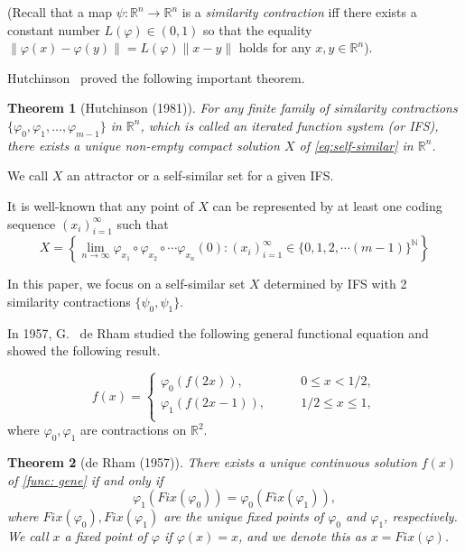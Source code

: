 \documentclass[epsf,10pt]{article}
\newtheorem{theorem}{Theorem}[section]
\begin{document}
(Recall that a map $\psi:\mathbb{R}^{n} \rightarrow \mathbb{R}^{n}$ is a {\it similarity contraction} iff there exists a constant number $L(\varphi) \in (0,1)$ so that the equality $\|\varphi(x)-\varphi(y)\|=L(\varphi)\|x-y\|$ holds for any $x,y \in \mathbb{R}^{n}$).

Hutchinson~\cite{Hutchinson-1981} proved the following important theorem. 
\begin{theorem}[Hutchinson (1981)]
\label{th:hutchinson}
For any finite family of similarity contractions $\{\varphi_0, \varphi_1, ..., \varphi_{m-1}\}$ in $\mathbb{R}^{n}$, which is called an iterated function system (or IFS), there exists a unique non-empty compact solution $X$ of \eqref{eq:self-similar} in $ \mathbb{R}^{n}$.
\end{theorem} 

We call $X$ an attractor or a self-similar set for a given IFS. 

It is well-known that any point of $X$ can be represented by at least one coding sequence $(x_i)_{i=1}^{\infty}$ such that 
\begin{equation*}
X= \left\{\lim_{n \to \infty} \varphi_{x_1} \circ \varphi_{x_2} \circ \cdots \varphi_{x_n} (0): (x_i)_{i=1}^{\infty} \in \{0,1,2, \cdots (m-1)\}^{\mathbb{N}}\right\}
\end{equation*}

In this paper, we focus on a self-similar set $X$ determined by IFS with 2 similarity contractions $\{\psi_0,\psi_1\}$.

\bigskip

In 1957, G. ~de Rham studied the following general functional equation and showed the following result.  

\begin{equation}
 \label{func: gene}
        f(x)=
        \begin{cases}
                 \varphi_{0}(f(2x)),
                        & \qquad 0 \leq x < 1/2, \\
                 \varphi_{1}(f(2x-1)),
                        & \qquad 1/2 \leq x \leq 1, \\
        \end{cases}
\end{equation}
where $\varphi_{0}, \varphi_{1}$ are contractions on $\mathbb{R}^2$.

\begin{theorem}[de Rham (1957)]
There exists a unique continuous solution $f(x)$ of \eqref{func: gene} if and only if 
$$\varphi_{1}(Fix (\varphi_0)) = \varphi_{0}(Fix(\varphi_1)),$$ 
where $Fix (\varphi_0), Fix (\varphi_1)$ are the unique fixed points of $\varphi_{0}$ and $\varphi_{1}$, respectively. We call $x$ a fixed point of $\varphi$ if $\varphi(x)=x$, and we denote this as $x= Fix(\varphi)$.
\end{theorem}
\end{document}
